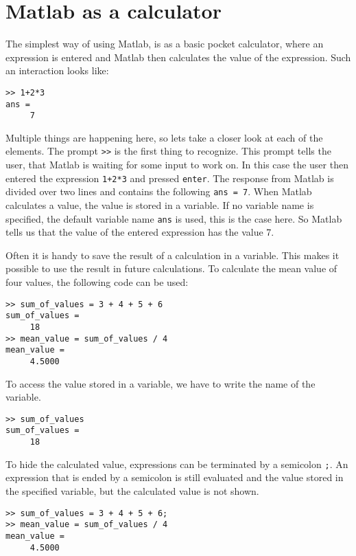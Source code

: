\section{Matlab as a calculator}

\newcommand{\known}[1]{\todo[inline, color=green!20, nolist]{New commands: \texttt{#1}}}

The simplest way of using Matlab, is as a basic pocket calculator, where an
expression is entered and Matlab then calculates the value of the expression.
Such an interaction looks like:
\begin{lstlisting}
>> 1+2*3
ans =
     7
\end{lstlisting}
Multiple things are happening here, so lets take a closer look at each of the
elements.
The prompt \verb!>>! is the first thing to recognize.
This prompt tells the user, that Matlab is waiting for some input to work on.
In this case the user then entered the expression \verb!1+2*3! and pressed 
\verb!enter!.
The response from Matlab is divided over two lines and contains the following 
\verb!ans = 7!.
When Matlab calculates a value, the value is stored in a variable.
If no variable name is specified, the default variable name \verb!ans! is used, 
this is the case here.
So Matlab tells us that the value of the entered expression has the value 7.

Often it is handy to save the result of a calculation in a variable.
This makes it possible to use the result in future calculations.
To calculate the mean value of four values, the following code can be used:
\begin{lstlisting}
>> sum_of_values = 3 + 4 + 5 + 6
sum_of_values = 
     18
>> mean_value = sum_of_values / 4
mean_value =
     4.5000
\end{lstlisting}
To access the value stored in a variable, we have to write the name of the variable.
\begin{lstlisting}
>> sum_of_values
sum_of_values = 
     18
\end{lstlisting}
To hide the calculated value, expressions can be terminated by a semicolon \verb!;!.
An expression that is ended by a semicolon is still evaluated and the value stored in the
specified variable, but the calculated value is not shown.
\begin{lstlisting}
>> sum_of_values = 3 + 4 + 5 + 6;
>> mean_value = sum_of_values / 4
mean_value =
     4.5000
\end{lstlisting}

